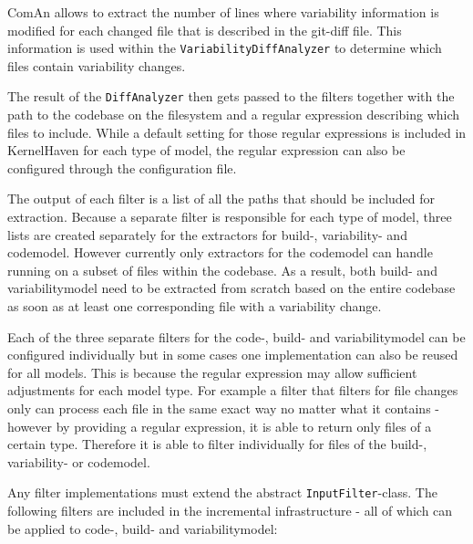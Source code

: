 \documentclass[a4paper]{article}
\begin{document}
ComAn allows to extract the number of lines where variability information is modified for each changed file that is described in the git-diff file. This information is used within the \texttt{VariabilityDiffAnalyzer} to determine which files contain variability changes.

The result of the \texttt{DiffAnalyzer} then gets passed to the filters together with the path to the codebase on the filesystem and a regular expression describing which files to include. While a default setting for those regular expressions is included in KernelHaven for each type of model, the regular expression can also be configured through the configuration file. 

The output of each filter is a list of all the paths that should be included for extraction. Because a separate filter is responsible for each type of model, three lists are created separately for the extractors for build-, variability- and codemodel.
However currently only extractors for the codemodel can handle running on a subset of files within the codebase. As a result, both build- and variabilitymodel need to be extracted from scratch based on the entire codebase as soon as at least one corresponding file with a variability change.

Each of the three separate filters for the code-, build- and variabilitymodel can be configured individually but in some cases one implementation can also be reused for all models. This is because the regular expression may allow sufficient adjustments for each model type. For example a filter that filters for file changes only can process each file in the same exact way no matter what it contains - however by providing a regular expression, it is able to return only files of a certain type. Therefore it is able to filter individually for files of the build-, variability- or codemodel.

 Any filter implementations must extend the abstract \texttt{InputFilter}-class. The following filters are included in the incremental infrastructure - all of which can be applied to code-, build- and variabilitymodel:
\end{document}

